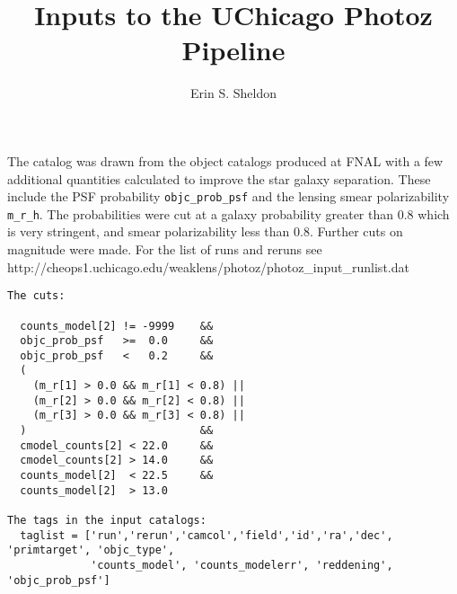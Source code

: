 \documentclass[preprint]{aastex}
\begin{document}
\title{Inputs to the UChicago Photoz Pipeline}

\author{
Erin S. Sheldon}


\begin{abstract}

\end{abstract}
The catalog was drawn from the object catalogs produced at FNAL with a few
additional quantities calculated to improve the star galaxy separation.  
These include the PSF probability \texttt{objc\_prob\_psf} and the lensing 
smear polarizability \texttt{m\_r\_h}.  The probabilities were cut
at a galaxy probability greater than 0.8 which is very stringent, and
smear polarizability less than 0.8. Further cuts on magnitude were made.
For the list of runs and reruns see 
\newline
http://cheops1.uchicago.edu/weaklens/photoz/photoz\_input\_runlist.dat

\begin{verbatim}
The cuts:

  counts_model[2] != -9999    &&
  objc_prob_psf   >=  0.0     &&
  objc_prob_psf   <   0.2     &&
  (
    (m_r[1] > 0.0 && m_r[1] < 0.8) || 
    (m_r[2] > 0.0 && m_r[2] < 0.8) || 
    (m_r[3] > 0.0 && m_r[3] < 0.8) || 
  )                           &&
  cmodel_counts[2] < 22.0     &&
  cmodel_counts[2] > 14.0     &&
  counts_model[2]  < 22.5     &&
  counts_model[2]  > 13.0

The tags in the input catalogs:
  taglist = ['run','rerun','camcol','field','id','ra','dec', 'primtarget', 'objc_type', 
             'counts_model', 'counts_modelerr', 'reddening', 'objc_prob_psf']
\end{verbatim}
\end{document}
